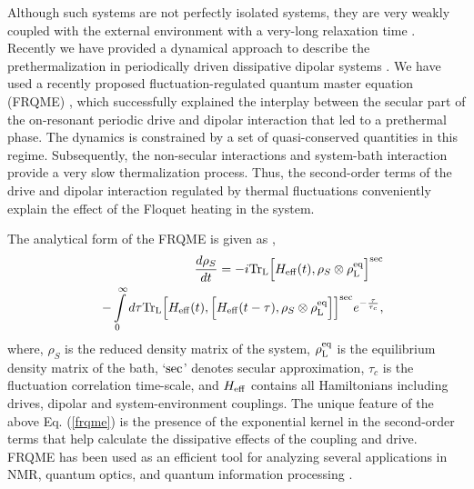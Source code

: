 \documentclass[prl,aps,twocolumn,floatfix]{revtex4-1}
\newcommand{\heff}{H_{\scriptstyle \rm eff}}
\newcommand{\nn}{\nonumber}
\newcommand{\trl}{\text{Tr}_{ \scriptstyle \rm L}}
\newcommand{\rh}{\rho_{\scriptstyle  S}}
\newcommand{\rl}{\rho_{\scriptstyle \rm L}^{\scriptstyle \rm eq}}
\begin{document}
 Although such systems are not perfectly isolated systems, they are very weakly coupled with the external
environment with a very-long relaxation time \cite{beatrez_floquet_2021,peng_floquet_2021}. Recently we have provided a dynamical approach to describe the prethermalization in periodically
driven dissipative dipolar systems \cite{saha_cascaded_2023,chakrabarti_2022_creation}. We have used a
recently proposed fluctuation-regulated quantum master equation (FRQME) \cite{chakrabarti2018b}, which
successfully explained the interplay between the secular part of the on-resonant periodic drive and dipolar
interaction that led to a prethermal phase. The dynamics is constrained by a set of quasi-conserved
quantities in this regime. Subsequently, the non-secular interactions and system-bath interaction provide a
very slow thermalization process. Thus, the second-order terms of the drive and dipolar interaction
regulated by thermal fluctuations conveniently explain the effect of the Floquet heating in the system. 

The analytical form of the FRQME is given as \cite{chakrabarti2018b},
\begin{eqnarray} \label{frqme}
&&\frac{d\rh}{dt}= -i \trl\Big[\heff(t),\rh \otimes\rl\Big]^{\rm sec}\nn\\
&&-\int\limits^{\infty}_0 d\tau \trl\Big[\heff(t),\Big[\heff(t-\tau),\rh \otimes\rl\Big]\Big]^{\rm
sec}e^{-\frac{\tau}{\tau_c}},
\end{eqnarray} 
where, $\rh$ is the reduced density matrix of the system, $\rl$ is the equilibrium density matrix of the
bath, `$\rm sec$' denotes secular approximation, $\tau_c$ is the fluctuation correlation time-scale, and 
$\heff$ contains all Hamiltonians including drives, dipolar and system-environment couplings. The 
unique feature of the above Eq. (\ref{frqme}) is the presence of the exponential kernel in the second-order
terms that help calculate the dissipative effects of the coupling and drive. FRQME
has been used as an efficient tool for analyzing several applications in NMR, quantum optics, and quantum
information processing \cite{chanda2020,chatterjee_nonlinearity_2020,chanda2021,saha2022,saha_effects_2022}.
\end{document}
